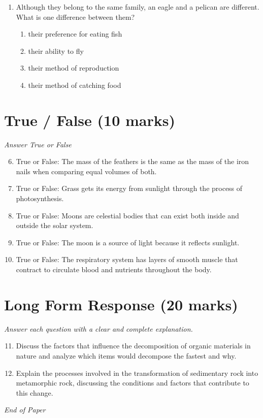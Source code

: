 \documentclass[12pt]{article}
\begin{document}
\begin{enumerate}[label=\arabic*.]
\begin{enumerate}[label=(\alph*)]
    \item changing rates of erosion.
    \item evaporation of sea water.
\end{enumerate}
\item Although they belong to the same family, an eagle and a pelican are different. What is one difference between them?
\begin{enumerate}[label=(\alph*)]
    \item their preference for eating fish
    \item their ability to fly
    \item their method of reproduction
    \item their method of catching food
\end{enumerate}
\end{enumerate}

\section*{True / False (10 marks)}
\textit{Answer True or False}
\begin{enumerate}[label=\arabic*.]
\setcounter{enumi}{5}
\item True or False: The mass of the feathers is the same as the mass of the iron nails when comparing equal volumes of both.
\item True or False: Grass gets its energy from sunlight through the process of photosynthesis.
\item True or False: Moons are celestial bodies that can exist both inside and outside the solar system.
\item True or False: The moon is a source of light because it reflects sunlight.
\item True or False: The respiratory system has layers of smooth muscle that contract to circulate blood and nutrients throughout the body.
\end{enumerate}

\section*{Long Form Response (20 marks)}
\textit{Answer each question with a clear and complete explanation.}
\begin{enumerate}[label=\arabic*.]
\setcounter{enumi}{10}
\item Discuss the factors that influence the decomposition of organic materials in nature and analyze which items would decompose the fastest and why.
\item Explain the processes involved in the transformation of sedimentary rock into metamorphic rock, discussing the conditions and factors that contribute to this change.
\end{enumerate}

\vfill
\noindent\textit{End of Paper}
\end{document}
